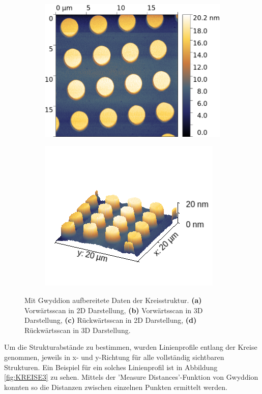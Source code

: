 \begin{figure}[H]
\begin{subfigure}{0.49\textwidth}
        \caption{}
    \end{subfigure}
    \begin{subfigure}{0.49\textwidth}
        \includegraphics[width=\textwidth]{bilder/Mikrostruktur/Kreis_Bac_2D.png}
        \caption{}
    \end{subfigure}
    \begin{subfigure}{0.49\textwidth}
        \includegraphics[width=\textwidth]{bilder/Mikrostruktur/Kreis_Bac_3D.png}
        \caption{}
    \end{subfigure}
    \caption{Mit Gwyddion aufbereitete Daten der Kreisstruktur. \textbf{(a)} Vorwärtsscan in 2D Darstellung, \textbf{(b)} Vorwärtsscan in 3D Darstellung, \textbf{(c)} Rückwärtsscan in 2D Darstellung, \textbf{(d)} Rückwärtsscan in 3D Darstellung.}
    \label{fig:KREIS2}
\end{figure}
Um die Strukturabstände zu bestimmen, wurden Linienprofile entlang der Kreise genommen, 
jeweils in x- und y-Richtung für alle vollständig sichtbaren Strukturen. Ein Beispiel für ein solches Linienprofil ist in Abbildung \ref{fig:KREISE3}
zu sehen. Mittels der 'Measure Distances'-Funktion von Gwyddion konnten so die Distanzen zwischen einzelnen Punkten ermittelt werden.

